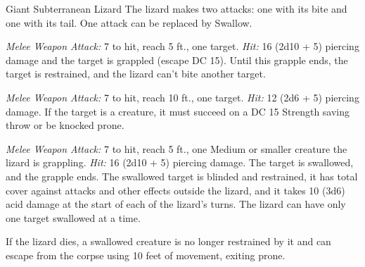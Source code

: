 \documentclass[10pt,a4paper,twoside,bg=print,twocolumn,openany,nodeprecatedcode]{dndbook}
\begin{document}
\begin{DndMonster}[float=t]{Giant Subterranean Lizard}
\DndMonsterBasics[
armor-class = {14 (natural armor)},
hit-points = {\DndDice{7d12 + 21}},
speed = {30 ft., swim 50 ft.}
]
\DndMonsterAbilityScores[
 str = 21,
 dex = 9,
 con = 17,
 int = 2,
 wis = 10,
 cha = 7
]
\DndMonsterDetails[
skills = {Stealth +3},
challenge = 4,
]
The lizard makes two attacks: one with its bite and one with its tail. One attack can be replaced by Swallow.

\textsl{Melee Weapon Attack:} 7 to hit, reach 5 ft., one target. \textsl{Hit:} 16 (2d10 + 5) piercing damage and the target is grappled (escape DC 15). Until this grapple ends, the target is restrained, and the lizard can't bite another target.

\textsl{Melee Weapon Attack:} 7 to hit, reach 10 ft., one target. \textsl{Hit:} 12 (2d6 + 5) piercing damage. If the target is a creature, it must succeed on a DC 15 Strength saving throw or be knocked prone.

\textsl{Melee Weapon Attack:} 7 to hit, reach 5 ft., one Medium or smaller creature the lizard is grappling. \textsl{Hit:} 16 (2d10 + 5) piercing damage. The target is swallowed, and the grapple ends. The swallowed target is blinded and restrained, it has total cover against attacks and other effects outside the lizard, and it takes 10 (3d6) acid damage at the start of each of the lizard's turns. The lizard can have only one target swallowed at a time.

If the lizard dies, a swallowed creature is no longer restrained by it and can escape from the corpse using 10 feet of movement, exiting prone.

\end{DndMonster}
\end{document}

